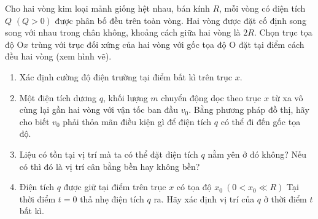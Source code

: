     \begin{vd}
Cho hai vòng kim loại mảnh giống hệt nhau, bán kính $R$, mỗi vòng có điện tích $Q$ $(Q > 0)$ được phân bố đều trên toàn vòng. Hai vòng được đặt cố định song song với nhau trong chân không, khoảng cách giữa hai vòng là $2R$. Chọn trục tọa độ $\mathrm{O}x$ trùng với trục đối xứng của hai vòng với gốc tọa độ $\mathrm{O}$ đặt tại điểm cách đều hai vòng (xem hình vẽ). 
\begin{enumerate}[1)]
    \item Xác định cường độ điện trường tại điểm bất kì trên trục $x$.
    \item Một điện tích dương $q$, khối lượng $m$ chuyển động dọc theo trục $x$ từ xa vô cùng lại gần hai vòng với vận tốc ban đầu $v_0$. Bằng phương pháp đồ thị, hãy cho biết $v_0$ phải thỏa mãn điều kiện gì để điện tích $q$ có thể đi đến gốc tọa độ.
    \item Liệu có tồn tại vị trí mà ta có thể đặt điện tích $q$ nằm yên ở đó không? Nếu có thì đó là vị trí cân bằng bền hay không bền?
    \item Điện tích $q$ được giữ tại điểm trên trục $x$ có tọa độ $x_0 \ (0<x_0\ll R)$ Tại thời điểm $t=0$ thả nhẹ điện tích $q$ ra. Hãy xác định vị trí của $q$ ở thời điểm $t$ bất kì.
\end{enumerate}
\begin{center}



\begin{tikzpicture}[x=0.75pt,y=0.75pt,yscale=-1,xscale=1]


\end{tikzpicture}
\end{center}
\end{vd}
